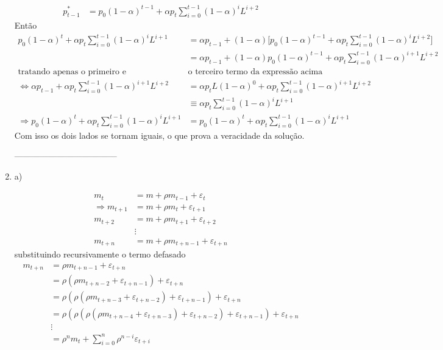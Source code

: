 \begin{enumerate}
\begin{align*}
		p^*_{t-1}&=p_0(1-\alpha)^{t-1}+ \alpha p_{t} \sum \limits_{i=0}^{t-1}(1-\alpha)^{i}L^{i+2}
	\end{align*}
	Então
	\begin{align*}
		p_0(1-\alpha)^t+ \alpha p_t \sum \limits_{i=0}^{t-1}(1-\alpha)^iL^{i+1}&=\alpha p_{t-1}+(1-\alpha)\bigg[p_0(1-\alpha)^{t-1}+ \alpha p_{t} \sum \limits_{i=0}^{t-1}(1-\alpha)^{i}L^{i+2}\bigg]\\
		&=\alpha p_{t-1}+(1-\alpha)p_0(1-\alpha)^{t-1}+\alpha p_t \sum \limits_{i=0}^{t-1}(1-\alpha)^{i+1}L^{i+2}\\
		\text{tratando apenas o primeiro e }&\text{o terceiro termo da expressão acima}\\
		\Longleftrightarrow \alpha p_{t-1}+\alpha p_t \sum \limits_{i=0}^{t-1}(1-\alpha)^{i+1}L^{i+2}&=\alpha p_tL(1-\alpha)^0+\alpha p_t \sum \limits_{i=0}^{t-1}(1-\alpha)^{i+1}L^{i+2}\\
		&\equiv \alpha p_t \sum \limits_{i=0}^{t-1}(1-\alpha)^{i}L^{i+1}\\
		\Rightarrow p_0(1-\alpha)^t+ \alpha p_t \sum \limits_{i=0}^{t-1}(1-\alpha)^iL^{i+1}&=	p_0(1-\alpha)^t+ \alpha p_t \sum \limits_{i=0}^{t-1}(1-\alpha)^iL^{i+1}
	\end{align*}
	Com isso os dois lados se tornam iguais, o que prova a veracidade da solução.
	
	------------------------------------
	
	\item a) 
	
	\begin{align*}
		m_t&=m+\rho m_{t-1}+\varepsilon_t\\
		\Rightarrow m_{t+1}&=m+\rho m_{t}+\varepsilon_{t+1}\\
		 m_{t+2}&=m+\rho m_{t+1}+\varepsilon_{t+2}\\
		 &\vdots\\
		  m_{t+n}&=m+\rho m_{t+n-1}+\varepsilon_{t+n}
	\end{align*}
	substituindo recursivamente o termo defasado
	\begin{align*}
		m_{t+n}&=\rho m_{t+n-1}+\varepsilon_{t+n}\\
		&=\rho(\rho m_{t+n-2}+\varepsilon_{t+n-1})+\varepsilon_{t+n}\\
		&=\rho(\rho (\rho m_{t+n-3}+\varepsilon_{t+n-2})+\varepsilon_{t+n-1})+\varepsilon_{t+n}\\
		&=\rho(\rho (\rho (\rho m_{t+n-4}+\varepsilon_{t+n-3})+\varepsilon_{t+n-2})+\varepsilon_{t+n-1})+\varepsilon_{t+n}\\
		&\vdots\\
		&=\rho^nm_t+\sum\limits_{i=0}^{n}\rho^{n-i}\varepsilon_{t+i}
	\end{align*}
	

\end{enumerate}
